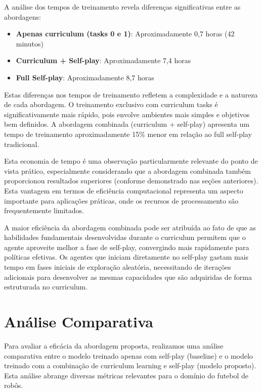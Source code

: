 A análise dos tempos de treinamento revela diferenças significativas entre as abordagens:

\begin{itemize}
    \item \textbf{Apenas curriculum (tasks 0 e 1)}: Aproximadamente 0,7 horas (42 minutos)
    \item \textbf{Curriculum + Self-play}: Aproximadamente 7,4 horas
    \item \textbf{Full Self-play}: Aproximadamente 8,7 horas
\end{itemize}

Estas diferenças nos tempos de treinamento refletem a complexidade e a natureza de cada abordagem. O treinamento exclusivo com curriculum tasks é significativamente mais rápido, pois envolve ambientes mais simples e objetivos bem definidos. A abordagem combinada (curriculum + self-play) apresenta um tempo de treinamento aproximadamente 15\% menor em relação ao full self-play tradicional.

Esta economia de tempo é uma observação particularmente relevante do ponto de vista prático, especialmente considerando que a abordagem combinada também proporcionou resultados superiores (conforme demonstrado nas seções anteriores). Esta vantagem em termos de eficiência computacional representa um aspecto importante para aplicações práticas, onde os recursos de processamento são frequentemente limitados.

A maior eficiência da abordagem combinada pode ser atribuída ao fato de que as habilidades fundamentais desenvolvidas durante o curriculum permitem que o agente aproveite melhor a fase de self-play, convergindo mais rapidamente para políticas efetivas. Os agentes que iniciam diretamente no self-play gastam mais tempo em fases iniciais de exploração aleatória, necessitando de iterações adicionais para desenvolver as mesmas capacidades que são adquiridas de forma estruturada no curriculum.

\section{Análise Comparativa}
\label{sec:analise_comparativa}

Para avaliar a eficácia da abordagem proposta, realizamos uma análise comparativa entre o modelo treinado apenas com self-play (baseline) e o modelo treinado com a combinação de curriculum learning e self-play (modelo proposto). Esta análise abrange diversas métricas relevantes para o domínio do futebol de robôs.

